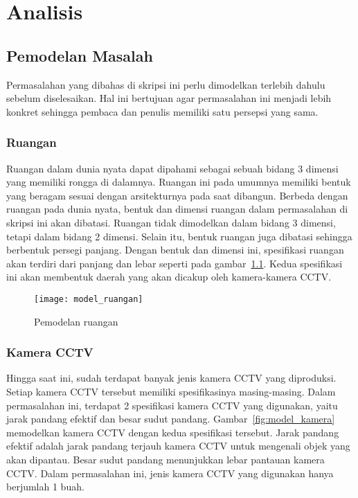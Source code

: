 \chapter{Analisis}

\section{Pemodelan Masalah}
Permasalahan yang dibahas di skripsi ini perlu dimodelkan terlebih dahulu sebelum diselesaikan. Hal ini bertujuan agar permasalahan ini menjadi lebih konkret sehingga pembaca dan penulis memiliki satu persepsi yang sama.


\subsection{Ruangan}
Ruangan dalam dunia nyata dapat dipahami sebagai sebuah bidang 3 dimensi yang memiliki rongga di dalamnya. Ruangan ini pada umumnya memiliki bentuk yang beragam sesuai dengan arsitekturnya pada saat dibangun. Berbeda dengan ruangan pada dunia nyata, bentuk dan dimensi ruangan dalam permasalahan di skripsi ini akan dibatasi. Ruangan tidak dimodelkan dalam bidang 3 dimensi, tetapi dalam bidang 2 dimensi. Selain itu, bentuk ruangan juga dibatasi sehingga berbentuk persegi panjang. Dengan bentuk dan dimensi ini, spesifikasi ruangan akan terdiri dari panjang dan lebar seperti pada gambar~\ref{fig:model_ruangan}. Kedua spesifikasi ini akan membentuk daerah yang akan dicakup oleh kamera-kamera CCTV.

\begin{figure}[H]
	\centering  
	\texttt{[image: model\_ruangan]}
	\caption[Pemodelan ruangan]{Pemodelan ruangan} 
	\label{fig:model_ruangan}
\end{figure}


\subsection{Kamera CCTV}
Hingga saat ini, sudah terdapat banyak jenis kamera CCTV yang diproduksi. Setiap kamera CCTV tersebut memiliki spesifikasinya masing-masing. Dalam permasalahan ini, terdapat 2 spesifikasi kamera CCTV yang digunakan, yaitu jarak pandang efektif dan besar sudut pandang. Gambar~\ref{fig:model_kamera} memodelkan kamera CCTV dengan kedua spesifikasi tersebut. Jarak pandang efektif adalah jarak pandang terjauh kamera CCTV untuk mengenali objek yang akan dipantau. Besar sudut pandang menunjukkan lebar pantauan kamera CCTV. Dalam permasalahan ini, jenis kamera CCTV yang digunakan hanya berjumlah 1 buah.

